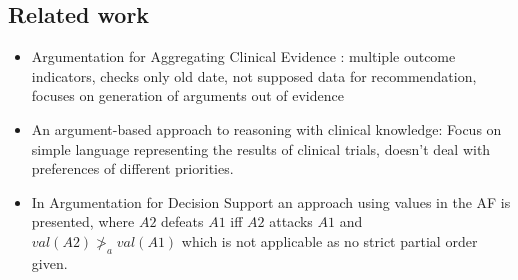 \subsection{Related work}
\begin{itemize}
	\item Argumentation for Aggregating Clinical Evidence \cite{hunter}: multiple outcome indicators, checks only old date, not supposed data for recommendation, focuses on generation of arguments out of evidence
	\item An argument-based approach to reasoning with clinical knowledge\cite{Gorogiannis20091}: Focus on simple language representing the results of clinical trials, doesn't deal with preferences of different priorities.
	\item In Argumentation for Decision Support\cite{Atkinson2006} an approach using values in the AF is presented, where $A2$ defeats $A1$ iff $A2$ attacks $A1$ and $val(A2) \ngtr_a val(A1)$ which is not applicable as no strict partial order given.
\end{itemize}
